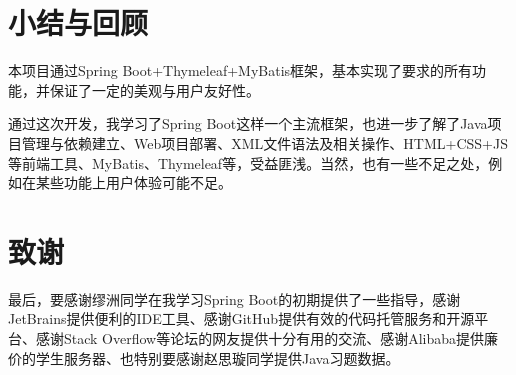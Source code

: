 \documentclass{nwafucoursepaper}
\begin{document}
\section{小结与回顾}

本项目通过Spring Boot+Thymeleaf+MyBatis框架，基本实现了要求的所有功能，并保证了一定的美观与用户友好性。

通过这次开发，我学习了Spring Boot这样一个主流框架，也进一步了解了Java项目管理与依赖建立、Web项目部署、XML文件语法及相关操作、HTML+CSS+JS等前端工具、MyBatis、Thymeleaf等，受益匪浅。当然，也有一些不足之处，例如在某些功能上用户体验可能不足。

\section{致谢}

最后，要感谢缪洲同学在我学习Spring Boot的初期提供了一些指导，感谢JetBrains提供便利的IDE工具、感谢GitHub提供有效的代码托管服务和开源平台、感谢Stack Overflow等论坛的网友提供十分有用的交流、感谢Alibaba提供廉价的学生服务器、也特别要感谢赵思璇同学提供Java习题数据。

\end{document}
